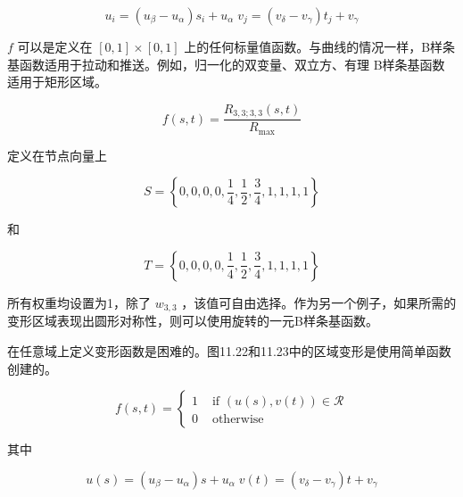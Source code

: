 \documentclass[../main.tex]{subfiles}
\begin{document}
\[
{u}_{i} = \left( {{u}_{\beta } - {u}_{\alpha }}\right) {s}_{i} + {u}_{\alpha }\;{v}_{j} = \left( {{v}_{\delta } - {v}_{\gamma }}\right) {t}_{j} + {v}_{\gamma }
\]

\(f\) 可以是定义在 \(\left\lbrack  {0,1}\right\rbrack   \times  \left\lbrack  {0,1}\right\rbrack\) 上的任何标量值函数。与曲线的情况一样，B样条基函数适用于拉动和推送。例如，归一化的双变量、双立方、有理 B样条基函数适用于矩形区域。

\[
f\left( {s,t}\right)  = \frac{{R}_{3,3;3,3}\left( {s,t}\right) }{{R}_{\max }} \tag{11.50}
\]





定义在节点向量上

\[
S = \left\{  {0,0,0,0,\frac{1}{4},\frac{1}{2},\frac{3}{4},1,1,1,1}\right\}
\]

和

\[
T = \left\{  {0,0,0,0,\frac{1}{4},\frac{1}{2},\frac{3}{4},1,1,1,1}\right\}
\]

所有权重均设置为1，除了 \({w}_{3,3}\) ，该值可自由选择。作为另一个例子，如果所需的变形区域表现出圆形对称性，则可以使用旋转的一元B样条基函数。

在任意域上定义变形函数是困难的。图11.22和11.23中的区域变形是使用简单函数创建的。

\[
f\left( {s,t}\right)  = \left\{  \begin{array}{ll} 1 & \text{ if }\left( {u\left( s\right) ,v\left( t\right) }\right)  \in  \mathcal{R} \\  0 & \text{ otherwise } \end{array}\right.  \tag{11.51}
\]

其中

\[
u\left( s\right)  = \left( {{u}_{\beta } - {u}_{\alpha }}\right) s + {u}_{\alpha }\;v\left( t\right)  = \left( {{v}_{\delta } - {v}_{\gamma }}\right) t + {v}_{\gamma }
\]
\end{document}
